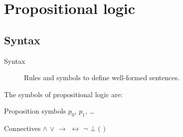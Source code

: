\chapter{Propositional logic}

\section{Syntax}
\begin{description}
    \item[Syntax] 
        Rules and symbols to define well-formed sentences.
\end{description}

The symbols of propositional logic are:
\begin{descriptionlist}
    \item[Proposition symbols] $p_0$, $p_1$, \dots
    \item[Connectives] $\land$ $\vee$ $\rightarrow$ $\leftrightarrow$ $\lnot$ $\bot$ $($ $)$
\end{descriptionlist}

